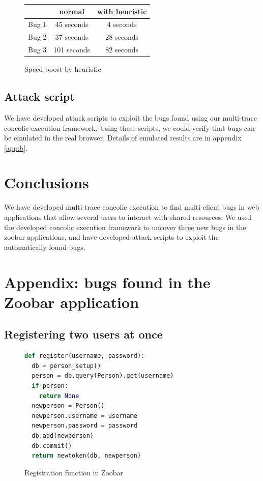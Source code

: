 \documentclass{llncs}
\begin{document}
\begin{figure}
  \begin{center}
    \begin{tabular}{l|c|c}
      \hline
      & normal & with heuristic \\
      \hline
      Bug 1 & 45 seconds & 4 seconds \\
      Bug 2 & 37 seconds & 28 seconds \\
      Bug 3 & 101 seconds & 82 seconds \\
      \hline
    \end{tabular}
  \end{center}
  \caption{Speed boost by heuristic}
  \label{fig:speed}
\end{figure}

\subsection{Attack script}

We have developed attack scripts to exploit the bugs found using our
multi-trace concolic execution framework. Using these scripts, we
could verify that bugs can be emulated in the real browser. Details of
emulated results are in appendix \ref{app:b}.

\section{Conclusions}

We have developed multi-trace concolic execution to find multi-client
bugs in web applications that allow several users to interact with
shared resources. We used the developed concolic execution framework
to uncover three new bugs in the zoobar applications, and have
developed attack scripts to exploit the automatically found bugs.

\newpage
\appendix

\section{Appendix: bugs found in the Zoobar application}
\label{app:a}

\subsection{Registering two users at once}

\begin{figure}
  \begin{lstlisting}[language=Python]
def register(username, password):
  db = person_setup()
  person = db.query(Person).get(username)
  if person:
    return None
  newperson = Person()
  newperson.username = username
  newperson.password = password
  db.add(newperson)
  db.commit()
  return newtoken(db, newperson)
  \end{lstlisting}
  \caption{Registration function in Zoobar}
  \label{fig:registration}
\end{figure}
\end{document}

